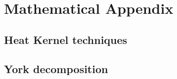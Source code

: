 \chapter{Mathematical Appendix}
\blindtext

\section{Heat Kernel techniques}
\blindtext

\section{York decomposition}
\blindtext
